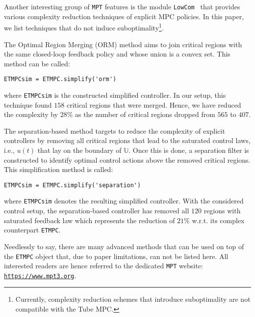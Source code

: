 \documentclass[letterpaper, 10 pt, conference]{ieeeconf}
\begin{document}
Another interesting group of \texttt{MPT} features is the module \texttt{LowCom}~\cite{KH15} that provides various complexity reduction techniques of explicit MPC policies. In this paper, we list techniques that do not induce suboptimality\footnote{Currently, complexity reduction schemes that introduce suboptimality are not compatible with the Tube MPC.}.

The Optimal Region Merging (ORM) method aims to join critical regions with the same closed-loop feedback policy and whose union is a convex set. This method can be called: 
\begin{lstlisting}[style=Matlab-editor]
ETMPCsim = ETMPC.simplify('orm')
\end{lstlisting}
where \verb|ETMPCsim| is the constructed simplified controller. In our setup, this technique found $158$ critical regions that were merged. Hence, we have reduced the complexity by $28\%$ as the number of critical regions dropped from $565$ to $407$. 

%
%
The separation-based method targets to reduce the complexity of explicit controllers by removing all critical regions that lead to the saturated control laws, i.e., $u(t)$ that lay on the boundary of $\mathbb{U}$. Once this is done, a separation filter is constructed to identify optimal control actions above the removed critical regions. This simplification method is called:
\begin{lstlisting}[style=Matlab-editor]
ETMPCsim = ETMPC.simplify('separation')
\end{lstlisting}
where \verb|ETMPCsim| denotes the resulting simplified controller. With the considered control setup, the separation-based controller has removed all $120$ regions with saturated feedback law which represents the reduction of $21\%$ w.r.t. its complex counterpart \verb|ETMPC|.

Needlessly to say, there are many advanced methods that can be used on top of the \verb|ETMPC| object that, due to paper limitations, can not be listed here. All interested readers are hence referred to the dedicated \texttt{MPT} website: \\ \texttt{\url{https://www.mpt3.org}}.
\end{document}
